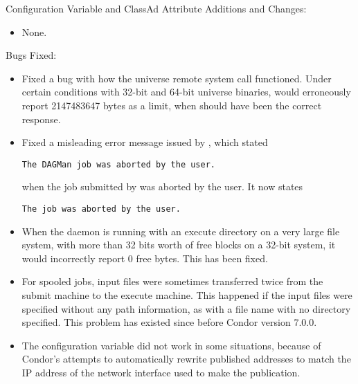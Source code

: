 \noindent Configuration Variable and ClassAd Attribute Additions and Changes:

\begin{itemize}

\item None.

\end{itemize}

\noindent Bugs Fixed:

\begin{itemize}

\item Fixed a bug with how the  universe 
remote system call  functioned.
Under certain conditions with
32-bit and 64-bit  universe binaries,
 would erroneously report 2147483647 bytes as a limit,
when  should have been the correct response.

\item Fixed a misleading error message issued by ,
which stated
\begin{verbatim}
The DAGMan job was aborted by the user.
\end{verbatim}
when the job submitted by  was aborted by the user.
It now states 
\begin{verbatim}
The job was aborted by the user.
\end{verbatim}

\item When the  daemon is running with an execute directory on
a very large file system, with more than 32 bits worth of free blocks
on a 32-bit system, it would incorrectly report 0 free bytes.  This
has been fixed.

\item For spooled jobs, input files were sometimes transferred twice from
the submit machine to the execute machine.  This happened if the input files
were specified without any path information,
as with a file name with no directory specified.
This problem has existed since before Condor version 7.0.0.

\item The configuration variable  did not
work in some situations, because of Condor's attempts to
automatically rewrite published addresses to match the IP address of
the network interface used to make the publication.


\end{itemize}
